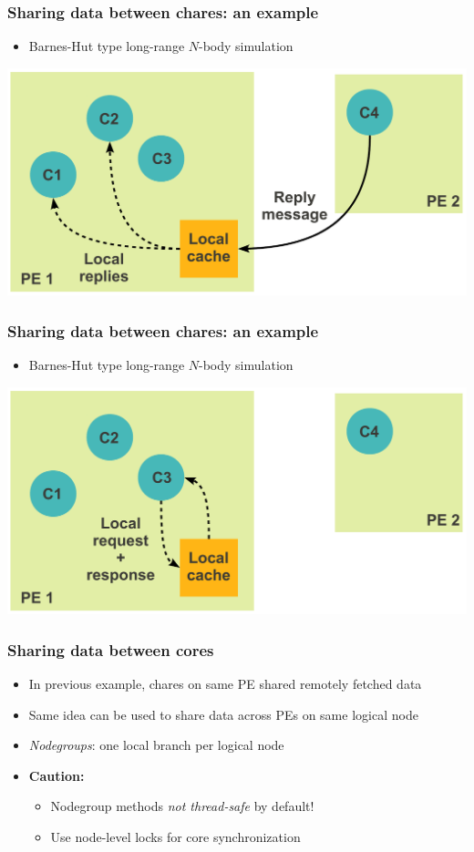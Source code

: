 \begin{frame}[fragile]
  \frametitle{Sharing data between chares: an example}
  \begin{itemize}
    \item Barnes-Hut type long-range $N$-body simulation
  \end{itemize}
  \includegraphics[width=\textwidth]{figures/advancedOpts/fig7}
\end{frame}

\begin{frame}[fragile]
  \frametitle{Sharing data between chares: an example}
  \begin{itemize}
    \item Barnes-Hut type long-range $N$-body simulation
  \end{itemize}
  \includegraphics[width=\textwidth]{figures/advancedOpts/fig8}
\end{frame}

\begin{frame}[fragile]
  \frametitle{Sharing data between cores}
  \begin{itemize}
    \item In previous example, chares on same PE shared remotely fetched data
    \item Same idea can be used to share data across PEs on same logical node
    \item {\em Nodegroups}: one local branch per logical node
    \item {\bf Caution:}
    \begin{itemize}
      \item Nodegroup methods {\em not thread-safe} by default! 
      \item Use node-level locks for core synchronization
    \end{itemize}
  \end{itemize}
\end{frame}
